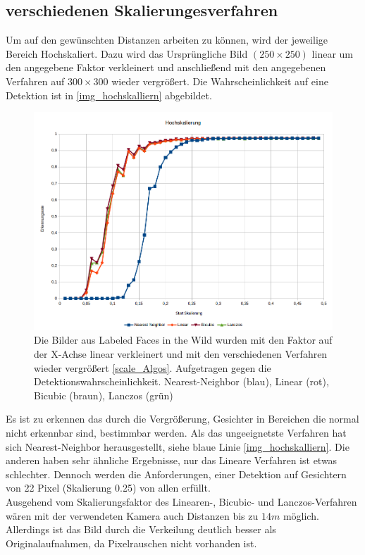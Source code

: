 \subsection{verschiedenen Skalierungesverfahren}
Um auf den gewünschten Distanzen arbeiten zu können, wird der jeweilige Bereich Hochskaliert. Dazu wird das Ursprüngliche Bild $(250\times 250)$ linear um den angegebene Faktor verkleinert und anschließend mit den angegebenen Verfahren auf $300\times 300$ wieder vergrößert. Die Wahrscheinlichkeit auf eine Detektion ist in \autoref{img_hochskalliern} abgebildet.\\
\begin{figure}
	\centering
	\includegraphics[width=0.5\linewidth]{img/Hochskalliern}
	\caption{Die Bilder aus Labeled Faces in the Wild \cite{database_Face} wurden mit den Faktor auf der X-Achse linear verkleinert und mit den verschiedenen Verfahren wieder vergrößert \autoref{scale_Algos}. Aufgetragen gegen die Detektionswahrscheinlichkeit.
	Nearest-Neighbor (blau), Linear (rot), Bicubic (braun), Lanczos (grün)}
	\label{img_hochskalliern}
\end{figure}
Es ist zu erkennen das durch die Vergrößerung, Gesichter in Bereichen die normal nicht erkennbar sind, bestimmbar werden. Als das ungeeignetste Verfahren hat sich Nearest-Neighbor herausgestellt, siehe blaue Linie \autoref{img_hochskalliern}. Die anderen haben sehr ähnliche Ergebnisse, nur das Lineare Verfahren ist etwas schlechter. Dennoch werden die Anforderungen, einer Detektion auf Gesichtern von 22 Pixel (Skalierung 0.25) von allen erfüllt.\\
Ausgehend vom Skalierungsfaktor des Linearen-, Bicubic- und Lanczos-Verfahren wären mit der verwendeten Kamera auch Distanzen bis zu $14m$ möglich. Allerdings ist das Bild durch die Verkeilung  deutlich besser als Originalaufnahmen, da Pixelrauschen nicht vorhanden ist.
